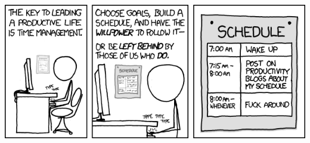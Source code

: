 \vfill

\begin{center}
\includegraphics[width=0.8\hsize]{info/xkcd/time_management.png}
\end{center}

